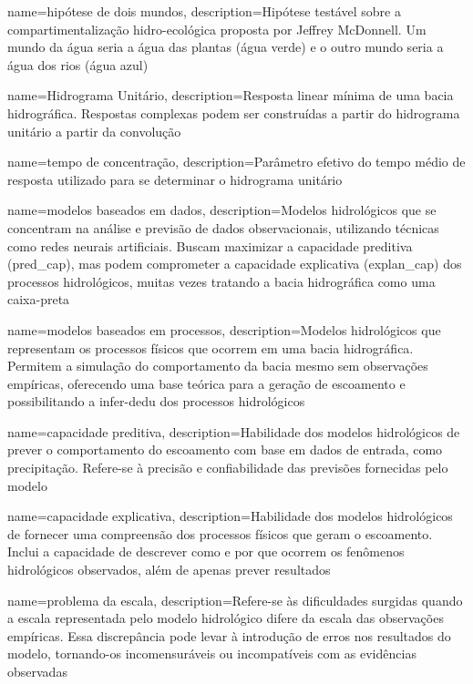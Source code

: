 {
    name=hipótese de dois mundos,
    description={Hipótese testável sobre a compartimentalização hidro-ecológica proposta por Jeffrey McDonnell. Um mundo da água seria a água das plantas (água verde) e o outro mundo seria a água dos rios (água azul)}
}

{
    name=Hidrograma Unitário,
    description={Resposta linear mínima de uma bacia hidrográfica. Respostas complexas podem ser construídas a partir do hidrograma unitário a partir da convolução}
}

{
    name=tempo de concentração,
    description={Parâmetro efetivo do tempo médio de resposta utilizado para se determinar o hidrograma unitário}
}

{
    name=modelos baseados em dados,
    description={Modelos hidrológicos que se concentram na análise e previsão de dados observacionais, utilizando técnicas como redes neurais artificiais. Buscam maximizar a capacidade preditiva (\gls{pred_cap}), mas podem comprometer a capacidade explicativa (\gls{explan_cap}) dos processos hidrológicos, muitas vezes tratando a bacia hidrográfica como uma caixa-preta}
}

{
    name=modelos baseados em processos,
    description={Modelos hidrológicos que representam os processos físicos que ocorrem em uma bacia hidrográfica. Permitem a simulação do comportamento da bacia mesmo sem observações empíricas, oferecendo uma base teórica para a geração de escoamento e possibilitando a \gls{infer-dedu} dos processos hidrológicos}
}

{
    name=capacidade preditiva,
    description={Habilidade dos modelos hidrológicos de prever o comportamento do escoamento com base em dados de entrada, como precipitação. Refere-se à precisão e confiabilidade das previsões fornecidas pelo modelo}
}

{
    name=capacidade explicativa,
    description={Habilidade dos modelos hidrológicos de fornecer uma compreensão dos processos físicos que geram o escoamento. Inclui a capacidade de descrever como e por que ocorrem os fenômenos hidrológicos observados, além de apenas prever resultados}
}

{
    name=problema da escala,
    description={Refere-se às dificuldades surgidas quando a escala representada pelo modelo hidrológico difere da escala das observações empíricas. Essa discrepância pode levar à introdução de erros nos resultados do modelo, tornando-os incomensuráveis ou incompatíveis com as evidências observadas}
}

